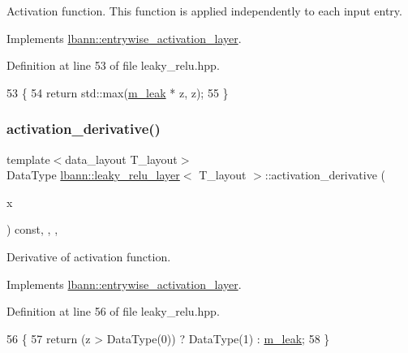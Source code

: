 Activation function. This function is applied independently to each input entry. 

Implements \hyperlink{classlbann_1_1entrywise__activation__layer_a69269401530a2112b66660383464bab9}{lbann\+::entrywise\+\_\+activation\+\_\+layer}.



Definition at line 53 of file leaky\+\_\+relu.\+hpp.


\begin{DoxyCode}
53                                                  \{
54     \textcolor{keywordflow}{return} std::max(\hyperlink{classlbann_1_1leaky__relu__layer_afafa6711960f1114b6247fcb5a30c36f}{m\_leak} * z, z);
55   \}
\end{DoxyCode}
\mbox{\label{classlbann_1_1leaky__relu__layer_af37ff5bcaefa8e533b3c497611ff43d4}} 
\subsubsection{\texorpdfstring{activation\+\_\+derivative()}{activation\_derivative()}}
{\footnotesize\ttfamily template$<$data\+\_\+layout T\+\_\+layout$>$ \\
Data\+Type \hyperlink{classlbann_1_1leaky__relu__layer}{lbann\+::leaky\+\_\+relu\+\_\+layer}$<$ T\+\_\+layout $>$\+::activation\+\_\+derivative (\begin{DoxyParamCaption}\item[{Data\+Type}]{x }\end{DoxyParamCaption}) const\hspace{0.3cm}{\ttfamily [inline]}, {\ttfamily [override]}, {\ttfamily [protected]}, {\ttfamily [virtual]}}

Derivative of activation function. 

Implements \hyperlink{classlbann_1_1entrywise__activation__layer_a7676a4c5060452a38264993554e79f8e}{lbann\+::entrywise\+\_\+activation\+\_\+layer}.



Definition at line 56 of file leaky\+\_\+relu.\+hpp.


\begin{DoxyCode}
56                                                             \{
57     \textcolor{keywordflow}{return} (z > DataType(0)) ? DataType(1) : \hyperlink{classlbann_1_1leaky__relu__layer_afafa6711960f1114b6247fcb5a30c36f}{m\_leak};
58   \}
\end{DoxyCode}
\mbox{\label{classlbann_1_1leaky__relu__layer_a5567cfef802bfed6be3e092970b88ff9}} 
